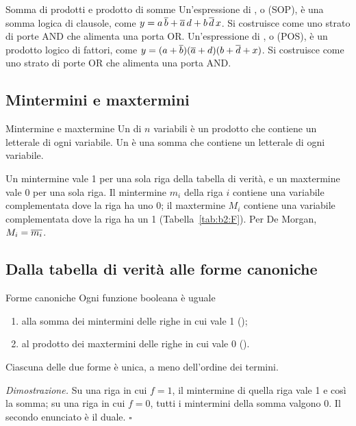 \begin{definition}{Somma di prodotti e prodotto di somme}
Un'espressione di , o  (SOP), è una somma
logica di clausole, come $y=a\,\overline{b}+\overline{a}\,d+b\,\overline{d}\,x$. Si
costruisce come uno strato di porte AND che alimenta una porta OR.
Un'espressione di , o  (POS), è un
prodotto logico di fattori, come $y=(a+\overline{b})(\overline{a}+d)(b+\overline{d}+x)$.
Si costruisce come uno strato di porte OR che alimenta una porta AND.
\end{definition}

\subsection{Mintermini e maxtermini}

\begin{definition}{Mintermine e maxtermine}
Un  di $n$ variabili è un prodotto che contiene un letterale
di ogni variabile. Un  è una somma che contiene un letterale
di ogni variabile.
\end{definition}

Un mintermine vale 1 per una sola riga della tabella di verità, e un
maxtermine vale 0 per una sola riga. Il mintermine $m_i$ della riga $i$
contiene una variabile complementata dove la riga ha uno 0; il maxtermine
$M_i$ contiene una variabile complementata dove la riga ha un 1
(Tabella~\ref{tab:b2:F}). Per De Morgan, $M_i=\overline{m_i}$.

\subsection{Dalla tabella di verità alle forme canoniche}

\begin{theorem}{Forme canoniche}
Ogni funzione booleana è uguale
\begin{enumerate}[nosep]
\item alla somma dei mintermini delle righe in cui vale 1 ();
\item al prodotto dei maxtermini delle righe in cui vale 0 ().
\end{enumerate}
Ciascuna delle due forme è unica, a meno dell'ordine dei termini.
\end{theorem}

\noindent\emph{Dimostrazione.} Su una riga in cui $f=1$, il mintermine di
quella riga vale 1 e così la somma; su una riga in cui $f=0$, tutti i
mintermini della somma valgono 0. Il secondo enunciato è il duale.
\hfill$\square$

